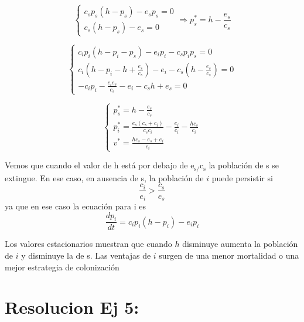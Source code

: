 \documentclass[twocolumn,aps,prl]{revtex4-1}
\begin{document}
$$
\left\{
\begin{array}{l}
    c_{s} p_{s}\left(h-p_{s}\right)-e_{s} p_{s}=0 \\
    c_{s}\left(h-p_{s}\right)-e_{s}=0
\end{array} 
\Rightarrow 
p_{s}^{*}=h-\frac{e_{s}}{c_{s}}
\right.
$$

\begin{equation}
    \left\{
    \begin{array}{l}
    c_{i} p_{i}\left(h-p_{i}-p_{s}\right)-e_{i} p_{i}-c_{s} p_{i} p_{s}=0 \\
    c_{i}\left(h-p_{i}-h+\frac{e_{s}}{c_{s}}\right)-e_{i}-c_{s}\left(h-\frac{e_{s}}{c_{s}}\right)=0 \\
    -c_{i} p_{i}-\frac{c_{i} e_{s}}{c_{s}}-e_{i}-c_{s} h+e_{s}=0
    \end{array}
    \right.
\end{equation}

\begin{equation}
    \left\{\begin{array}{l}
    p_{s}^{*}=h-\frac{e_{s}}{c_{s}} \\
    p_{i}^{*}=\frac{e_{s}\left(c_{s}+c_{i}\right)}{c_{s} c_{i}}-\frac{e_{i}}{c_{i}}-\frac{h c_{s}}{c_{i}} \\
    v^{*}=\frac{h c_{s}-e_{s}+e_{i}}{c_{i}}
    \end{array}\right.
\end{equation}

Vemos que cuando el valor de h está por debajo de $\mathrm{e}_{\mathrm{s} /} \mathrm{c}_{\mathrm{s}}$ la población de s se extingue. En ese caso, en ausencia de s, la población de $i$ puede persistir si
$$
\frac{c_{i}}{e_{i}}>\frac{c_{s}}{e_{s}}
$$
ya que en ese caso la ecuación para i es
$$
\frac{d p_{i}}{d t}=c_{i} p_{i}\left(h-p_{i}\right)-e_{i} p_{i}
$$

Los valores estacionarios muestran que cuando $h$ disminuye aumenta la población de $i $ y disminuye la de s. Las ventajas de $i$ surgen de una menor mortalidad o una mejor estrategia de colonización

% 
%                             
% 

\section{Resolucion Ej 5:}
\end{document}
